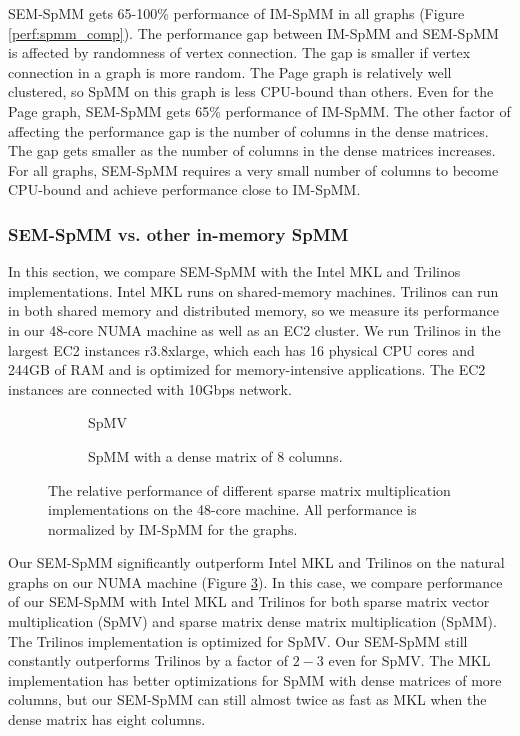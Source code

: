 SEM-SpMM gets 65-100\% performance of IM-SpMM in all graphs (Figure
\ref{perf:spmm_comp}). The performance gap between IM-SpMM and SEM-SpMM
is affected by randomness of vertex connection. The gap is smaller if
vertex connection in a graph is more random. The Page graph is relatively
well clustered, so SpMM on this graph is less CPU-bound than others.
Even for the Page graph, SEM-SpMM gets 65\% performance of IM-SpMM.
The other factor of affecting the performance gap is the number of columns
in the dense matrices. The gap gets smaller as the number of columns in
the dense matrices increases. For all graphs, SEM-SpMM requires a very small
number of columns to become CPU-bound and achieve performance close to IM-SpMM.

\subsubsection{SEM-SpMM vs. other in-memory SpMM}
In this section, we compare SEM-SpMM with the Intel MKL and Trilinos
implementations. Intel MKL runs on shared-memory machines. Trilinos can run in
both shared memory and distributed memory, so we measure its performance in
our 48-core NUMA machine as well as an EC2 cluster. We run Trilinos in the largest
EC2 instances r3.8xlarge, which each has 16 physical CPU cores and 244GB of RAM
and is optimized for memory-intensive applications. The EC2 instances are
connected with 10Gbps network.

\begin{figure}
	\footnotesize
	\centering
	\begin{subfigure}[b]{0.5\textwidth}
		\centering
		
		\vspace{-10pt}
		\caption{SpMV}
		\label{perf:spmv}
	\end{subfigure}
	\begin{subfigure}[b]{0.5\textwidth}
		\centering
		
		\vspace{-10pt}
		\caption{SpMM with a dense matrix of 8 columns.}
		\label{perf:spmm8}
	\end{subfigure}
	\vspace{3pt}
	\caption{The relative performance of different sparse matrix multiplication
		implementations on the 48-core machine. All performance is normalized by
	IM-SpMM for the graphs.}
	\label{perf:spmm}
\end{figure}

Our SEM-SpMM significantly outperform Intel MKL and Trilinos on the natural
graphs on our NUMA machine (Figure \ref{perf:spmm}). In this case, we compare
performance of our SEM-SpMM with Intel MKL and Trilinos for both sparse matrix
vector multiplication (SpMV) and sparse matrix dense matrix multiplication (SpMM).
The Trilinos implementation is optimized for SpMV. Our SEM-SpMM still
constantly outperforms Trilinos by a factor of $2-3$ even for SpMV. The MKL
implementation has better optimizations for SpMM with dense matrices of
more columns, but our SEM-SpMM can still almost twice as fast as MKL when
the dense matrix has eight columns.

